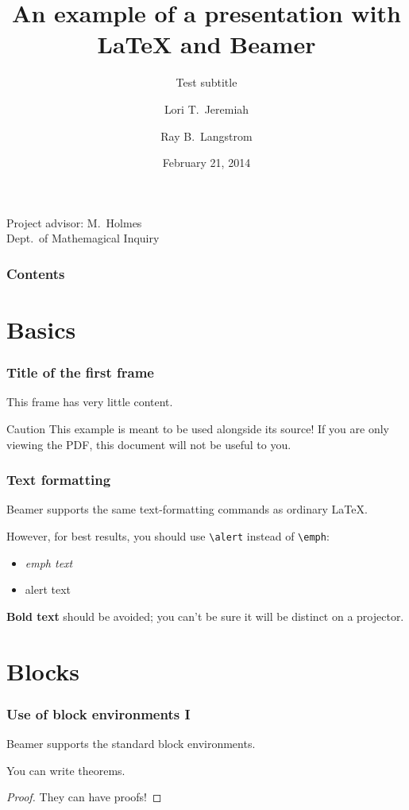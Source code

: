 \documentclass{beamer}
\title[Example presentation]{An example of a presentation with \LaTeX{} and Beamer}
\subtitle[Test]{Test subtitle}
\author[Jeremiah \and Langstrom]{Lori T.~Jeremiah \and Ray B.~Langstrom}
\institute[Carleton]{Carleton College}
\date{February 21, 2014}
\begin{document}
\begin{frame}
  \titlepage

  \begin{center}
    Project advisor: M.~Holmes \\
    Dept.~of Mathemagical Inquiry
  \end{center}
\end{frame}

\begin{frame}
  \frametitle{Contents}
  \tableofcontents
\end{frame}

\section{Basics}
\begin{frame}
  \frametitle{Title of the first frame}
  This frame has very little content.

  \begin{alertblock}{Caution}
    This example is meant to be used alongside its source!
    If you are only viewing the PDF, this document will not be useful to you.
  \end{alertblock}
\end{frame}

\begin{frame}[fragile] %
  \frametitle{Text formatting}
  Beamer supports the same text-formatting commands as ordinary \LaTeX{}.

  However, for best results, you should use \verb|\alert| instead of \verb|\emph|:

  \begin{itemize}
  \item \emph{emph text}
  \item \alert{alert text}
  \end{itemize}

  \textbf{Bold text} should be avoided; you can't be sure it will be distinct on a projector.
\end{frame}

\section{Blocks}
\begin{frame}
  \frametitle{Use of block environments I}
  Beamer supports the standard block environments.

  \begin{theorem}
    You can write theorems.
  \end{theorem}

  \begin{proof}
    They can have proofs!
  \end{proof}
\end{frame}
\end{document}
